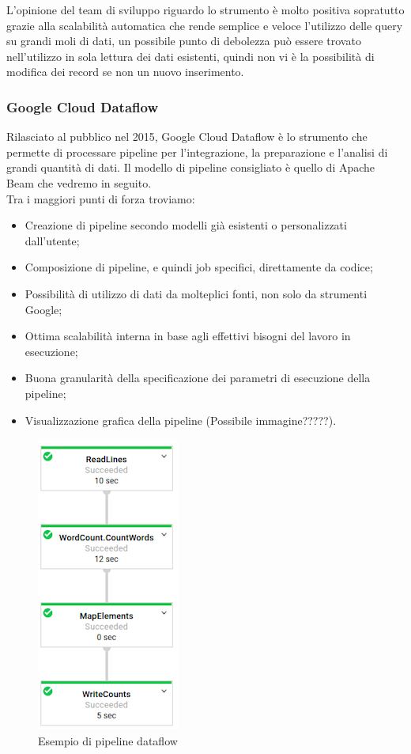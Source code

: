 L'opinione del team di sviluppo riguardo lo strumento è molto positiva sopratutto grazie alla scalabilità automatica che rende semplice e veloce l'utilizzo delle query su grandi moli di dati, un possibile punto di debolezza può essere trovato nell'utilizzo in sola lettura dei dati esistenti, quindi non vi è la possibilità di modifica dei record se non un nuovo inserimento.
\subsubsection{Google Cloud Dataflow}
Rilasciato al pubblico nel 2015, Google Cloud Dataflow è lo strumento che permette di processare pipeline per l'integrazione, la preparazione e l'analisi di grandi quantità di dati.
Il modello di pipeline consigliato è quello di Apache Beam che vedremo in seguito.
\\ Tra i maggiori punti di forza troviamo:
\begin{itemize}
	\item Creazione di pipeline secondo modelli già esistenti o personalizzati dall'utente;
	\item Composizione di pipeline, e quindi job specifici, direttamente da codice;
	\item Possibilità di utilizzo di dati da molteplici fonti, non solo da strumenti Google;
	\item Ottima scalabilità interna in base agli effettivi bisogni del lavoro in esecuzione;
	\item Buona granularità della specificazione dei parametri di esecuzione\cite{parametridiesecuzione} della pipeline;
	\item Visualizzazione grafica della pipeline (Possibile immagine?????). 
\end{itemize}

\begin{figure}[h!]
	\centering
	\includegraphics[scale=1]{figures/dataflow-job-full}
	\caption[Esempio di pipeline dataflow.]{Esempio di pipeline dataflow
		\label{fig:pipelinedataflow}}
\end{figure}	


